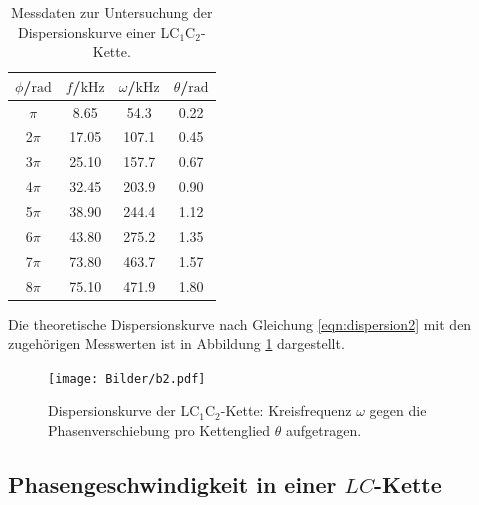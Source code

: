 \begin{table}
	\caption{Messdaten zur Untersuchung der Dispersionskurve einer LC$_1$C$_2$-Kette.}
	\label{tab:dispersioncc}
	\centering
	\begin{tabular}{cccc}
	\toprule
	$\phi$/$\si{\radian}$ & $f$/$\si{\kilo\Hz}$ & $\omega$/$\si{\kilo\Hz}$ & $\theta$/$\si{\radian}$ \\
	\midrule
		$\pi$ & 8.65 & 54.3 & 0.22 \\
		2$\pi$ & 17.05 & 107.1 & 0.45 \\
		3$\pi$ & 25.10 & 157.7 & 0.67 \\
		4$\pi$ & 32.45 & 203.9 & 0.90 \\
		5$\pi$ & 38.90 & 244.4 & 1.12 \\
		6$\pi$ & 43.80 & 275.2 & 1.35 \\
		7$\pi$ & 73.80 & 463.7 & 1.57 \\
		8$\pi$ & 75.10 & 471.9 & 1.80 \\
	\bottomrule
	\end{tabular}
\end{table}

Die theoretische Dispersionskurve nach Gleichung \eqref{eqn:dispersion2} mit den zugehörigen Messwerten ist in Abbildung \ref{fig:dispicc} dargestellt.

\begin{figure}
	\centering
	\texttt{[image: Bilder/b2.pdf]}
	\caption{Dispersionskurve der LC$_1$C$_2$-Kette: Kreisfrequenz $\omega$ gegen die Phasenverschiebung pro Kettenglied $\theta$ aufgetragen.}
	\label{fig:dispicc}
\end{figure}



\FloatBarrier
\subsection{Phasengeschwindigkeit in einer $LC$-Kette}

